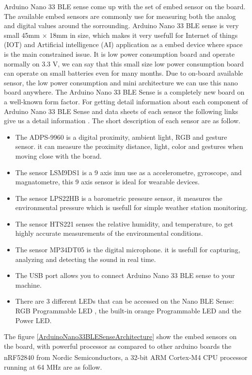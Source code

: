 Arduino Nano 33 BLE sense come up with the set of embed sensor on the board. The available embed sensors are commonly use for measuring both the analog and digital values around the sorrounding. Arduino Nano 33 BLE sense is very small 45mm $\times$ 18mm in size, which  makes it very usefull for Internet of things (IOT) and Artificial intelligence (AI) application as a embed device where space is the main constrained issue. It is low power consumption board and operate normally on 3.3 V, we can say that this small size low power consumption board can operate on small batteries even for many months. Due to on-board available sensor, the low power consumption and mini architecture we can use this nano board anywhere. The Arduino Nano 33 BLE Sense is a completely new board on a well-known form factor. For getting detail information about each component of Arduino Nano 33 BLE Sense and data sheets of each sensor the following links give us a detail information \cite{Arduino:2021}. The short description of each sensor are as follow. 

\begin{itemize}
    \item The ADPS-9960 is a digital proximity, ambient light, RGB and gesture sensor. it can measure the proximity distance, light, color and gestures when moving close with the borad.
    \item The sensor LSM9DS1 is a 9 axis \ac{imu} use as a accelerometre, gyroscope, and magnatometre, this 9 axis sensor is ideal for wearable devices.
    \item The sensor LPS22HB is a barometric pressure sensor, it measures the environmental pressure which is usefull for simple weather station monitoring. 
    \item The sensor HTS221 senses the relative humidity, and temperature, to get highly accurate measurements of the environmental conditions.
    \item The sensor MP34DT05 is the digital microphone. it is usefull for capturing, analyzing and detecting the sound in real time.
    \item The USB port allows you to connect  Arduino Nano 33 BLE sense to your machine.
    \item There are 3 different LEDs that can be accessed on the Nano BLE Sense: RGB Programmable LED , the built-in  orange Programmable LED and the Power LED.
    
\end{itemize}

The figure \ref{ArduinoNano33BLESenseArchitecture} show the embed sensors on the board, with powerful processor as compared to other arduino boards the nRF52840 from Nordic Semiconductors, a 32-bit ARM\textsuperscript{\textregistered} Cortex\textsuperscript{\texttrademark}-M4 CPU processor running at 64 MHz are as follow.

